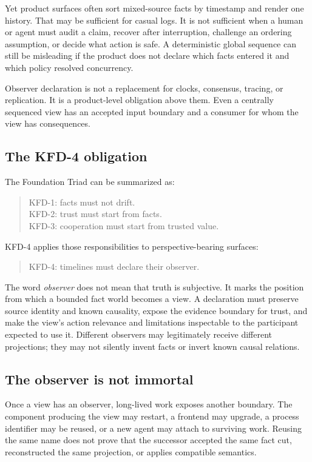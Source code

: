 Yet product surfaces often sort mixed-source facts by timestamp and render one
history. That may be sufficient for casual logs. It is not sufficient when a
human or agent must audit a claim, recover after interruption, challenge an
ordering assumption, or decide what action is safe. A deterministic global
sequence can still be misleading if the product does not declare which facts
entered it and which policy resolved concurrency.

Observer declaration is not a replacement for clocks, consensus, tracing, or
replication. It is a product-level obligation above them. Even a centrally
sequenced view has an accepted input boundary and a consumer for whom the view
has consequences.

\subsection{The KFD-4 obligation}

The Foundation Triad can be summarized as:

\begin{quote}
KFD-1: facts must not drift.\\
KFD-2: trust must start from facts.\\
KFD-3: cooperation must start from trusted value.
\end{quote}

KFD-4 applies those responsibilities to perspective-bearing surfaces:

\begin{quote}
KFD-4: timelines must declare their observer.
\end{quote}

The word \emph{observer} does not mean that truth is subjective. It marks the
position from which a bounded fact world becomes a view. A declaration must
preserve source identity and known causality, expose the evidence boundary for
trust, and make the view's action relevance and limitations inspectable to the
participant expected to use it. Different observers may legitimately receive
different projections; they may not silently invent facts or invert known
causal relations.

\subsection{The observer is not immortal}

Once a view has an observer, long-lived work exposes another boundary. The
component producing the view may restart, a frontend may upgrade, a process
identifier may be reused, or a new agent may attach to surviving work. Reusing
the same name does not prove that the successor accepted the same fact cut,
reconstructed the same projection, or applies compatible semantics.


